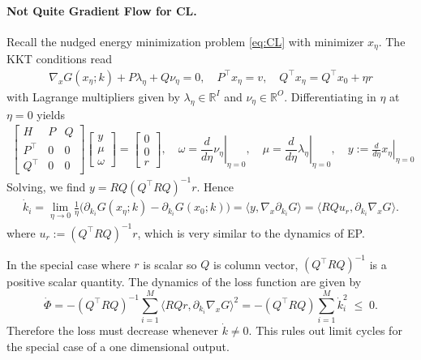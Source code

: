 \documentclass[final, 11pt, nonatbib]{elsarticle}
\theoremstyle{definition}
\theoremstyle{plain}
\numberwithin{equation}{section}
\begin{document}
\paragraph{Not Quite Gradient Flow for CL.}
Recall the nudged energy minimization problem \eqref{eq:CL} with minimizer $x_{\eta}$. The KKT conditions read
\begin{align}
\nabla_x G(x_\eta;k) + P\lambda_\eta +Q\nu_\eta = 0,\quad P^\top x_\eta = v, \quad Q^\top x_\eta = Q^\top x_0 + \eta r
\label{eq:kkt-eta-CL}
\end{align}
with Lagrange multipliers given by $ \lambda_\eta \in \mathbb{R}^I$ and $\nu_\eta \in \mathbb{R}^{O}.$ Differentiating in $\eta$ at $\eta=0$ yields
\begin{align}
\begin{bmatrix}
H & P & Q\\
P^\top & 0 & 0 \\
Q^\top & 0 & 0
\end{bmatrix}
\begin{bmatrix}
y\\[2pt]
\mu\\
\omega
\end{bmatrix}
=
\begin{bmatrix}
0\\
0\\
r
\end{bmatrix}, \quad  \omega =\left.\dfrac{d}{d\eta}\nu_\eta\right|_{\eta=0} ,\quad \mu =\left.\dfrac{d}{d\eta}\lambda_\eta\right|_{\eta=0} ,\quad
y:= \left. \frac{d}{d\eta}x_\eta\right |_{\eta=0}  \label{eq:psi2}
\end{align}
Solving, we find $y = R Q (Q^\top RQ)^{-1}r$. Hence
\begin{align}
\dot{k}_i=\lim_{\eta\to 0}\frac{1}{\eta}\Big(\partial_{k_i}G(x_\eta;k)-\partial_{k_i}G(x_0;k)\Big)
= \big\langle y, \nabla_x \partial_{k_i}G\big\rangle
= \big\langle R Q u_r,\partial_{k_i}\nabla_x G\big\rangle.\label{eq:dynamics-CL}
\end{align}
where $u_r:=(Q^\top RQ)^{-1}r$, which is very similar to the dynamics of EP. 

In the special case where $r$ is scalar so $Q$ is column vector, $(Q^\top RQ)^{-1}$ is a positive scalar quantity. The dynamics of the loss function are given by
\begin{equation}
\dot{\Phi}
= - (Q^\top RQ)^{-1}\sum_{i=1}^M\big\langle R Q r,\partial_{k_i}\nabla_x G\big\rangle^2
= - (Q^\top RQ)\sum_{i=1}^M \dot{k}_i^2
\;\le\;0.
\end{equation}
Therefore the loss must decrease whenever $\dot{k}\neq 0$. This rules out limit cycles for the special case of a one dimensional output.
\end{document}
